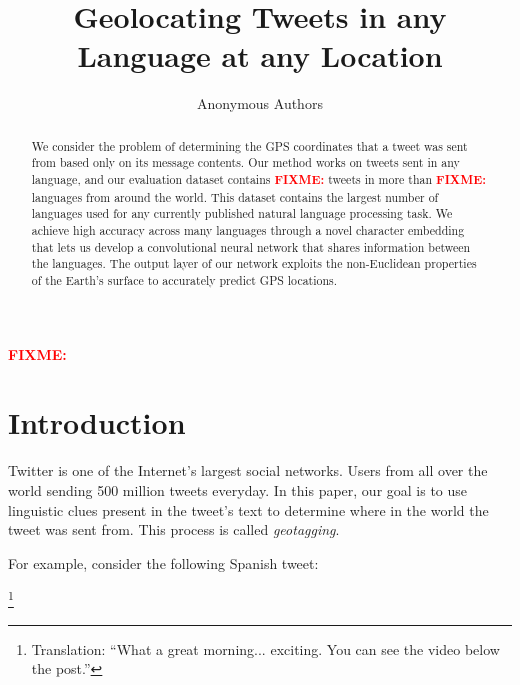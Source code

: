 \documentclass[sigconf,10pt]{acmart}
\title{Geolocating Tweets in any Language at any Location}
\author{Anonymous Authors}
\affiliation{}
\newcommand{\defn}[1]{\textit{#1}}
\newcommand{\fixme}[1]{\textcolor{red}{\textbf{FIXME:} {#1}}}
\begin{document}
\begin{abstract}
    We consider the problem of determining the GPS coordinates that a tweet was sent from based only on its message contents.
    Our method works on tweets sent in any language,
    and our evaluation dataset contains \fixme{} tweets in more than \fixme{} languages from around the world.
    This dataset contains the largest number of languages used for any currently published natural language processing task.
    We achieve high accuracy across many languages through a novel character embedding that lets us develop a convolutional neural network that shares information between the languages.
    The output layer of our network exploits the non-Euclidean properties of the Earth's surface to accurately predict GPS locations.
\end{abstract}

%
%
\begin{CCSXML}
    \fixme{}
\end{CCSXML}



\keywords{\fixme{}}

\maketitle

\newpage
\section{Introduction}

Twitter is one of the Internet's largest social networks.
Users from all over the world sending 500 million tweets everyday.
In this paper, our goal is to use linguistic clues present in the tweet's text to determine where in the world the tweet was sent from.
This process is called \defn{geotagging}.

For example, consider the following Spanish tweet:

\noindent
{}%
\footnote{Translation: ``What a great morning... exciting.  You can see the video below the post.''}
\end{document}
